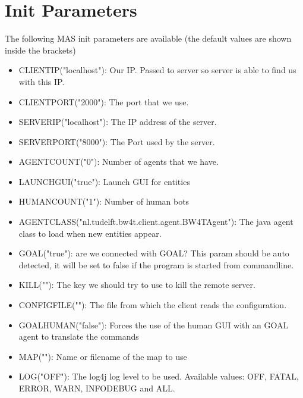 \section{Init Parameters}
The following MAS init parameters are available (the default values are shown inside the brackets)

\begin{itemize}
\item

    CLIENTIP("localhost"):    Our IP. Passed to server so server is able to find us with this IP. 

\item
    CLIENTPORT("2000"):   The port that we use. 


\item
    SERVERIP("localhost"):
 The IP address of the server. 
  
\item
    SERVERPORT("8000"):
   The Port used by the server. 

\item
    AGENTCOUNT("0"):
 Number of agents that we have. 
    
\item
    LAUNCHGUI("true"):
    Launch GUI for entities

\item
    HUMANCOUNT("1"):
    Number of human bots 

\item
    AGENTCLASS("nl.tudelft.bw4t.client.agent.BW4TAgent"):
    The java agent class to load when new entities appear.
   

\item
    GOAL("true"):
    are we connected with GOAL? This param should be auto detected, it will be set to false if the program is started from commandline.

\item
    KILL(""):
  The key we should try to use to kill the remote server.
 
\item
    CONFIGFILE(""):
    The file from which the client reads the configuration.
 
\item
    GOALHUMAN("false"):
    Forces the use of the human GUI with an GOAL agent to translate the commands

\item
    MAP(""):
    Name or filename of the map to use 
\item    
    LOG("OFF"):
    The log4j log level to be used. Available values: OFF, FATAL, ERROR, WARN, INFODEBUG and ALL.

\end{itemize}
